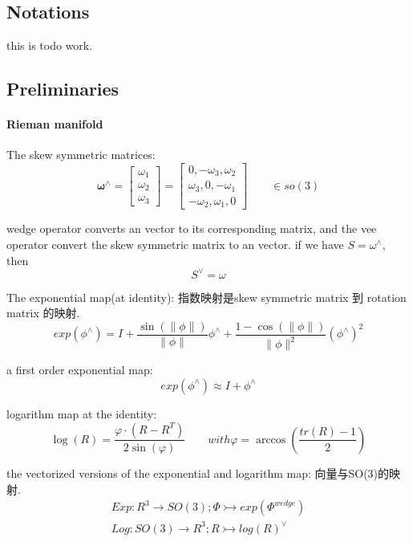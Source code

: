 \documentclass[10pt,a4paper]{article}
\begin{document}
\subsection{Notations}
this is todo work.
\subsection{Preliminaries}
\paragraph{Rieman manifold}
The skew symmetric matrices:
\begin{equation}
\mathbf{\omega}^\wedge =\begin{bmatrix}
\omega_1 \\
\omega_2 \\
\omega_3
\end{bmatrix}=\begin{bmatrix}
0, -\omega_3, \omega_2 \\
\omega_3, 0, -\omega_1 \\
-\omega_2, \omega_1, 0
\end{bmatrix}\qquad \in so(3)
\end{equation}

wedge operator converts an vector to its corresponding matrix, and the vee operator convert the skew symmetric matrix to an vector. if we have $S=\omega^{\wedge}$, then
\begin{equation}
S^{\vee}=\omega
\end{equation}

The exponential map(at identity): 指数映射是skew symmetric matrix 到 rotation matrix 的映射.
\begin{equation}
exp(\phi^\wedge)=I + \frac{\sin(\|\phi\|)}{\|\phi\|}\phi^\wedge + \frac{1-\cos(\|\phi\|)}{\|\phi\|^2} (\phi^\wedge)^2
\end{equation}

a first order exponential map:
\begin{equation}
exp(\phi^\wedge)\approx I + \phi^\wedge
\end{equation}

logarithm map at the identity:
\begin{equation}
\log(R)=\frac{\varphi \cdot (R-R^T)}{2\sin(\varphi)} \qquad 
with \varphi=\arccos(\frac{tr(R)-1}{2})
\end{equation}

the vectorized versions of the exponential and logarithm map: 向量与SO(3)的映射. 
\begin{subequations}
\begin{align}
Exp:  R^3 \rightarrow SO(3); \Phi \rightarrowtail exp(\Phi^{wedge}) \\
Log:  SO(3) \rightarrow R^3; R \rightarrowtail log(R)^{\vee}
\end{align}
\end{subequations}
\end{document}
